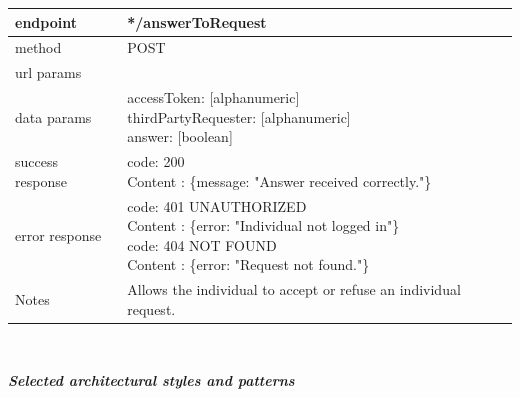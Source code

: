 \begin{legal}
\begin{itemize}
						\begin{tabularx}{\linewidth}{| l | l |}
							\hline
							endpoint & */answerToRequest \\
							\hline
							method & POST \\
							\hline
							url params & \\
							\hline
							data params &
							\parbox{0.7\textwidth}{
								\bigskip
								accessToken: [alphanumeric]\\
								thirdPartyRequester: [alphanumeric]\\
								answer: [boolean]
								\bigskip
							} \\
							\hline
							success response &
							\parbox{0.7\textwidth}{
								\bigskip
								code: 200\\
								Content : \{message: "Answer received correctly."\}
								\bigskip
							} \\
							\hline
							error response &
							\parbox{0.7\textwidth}{
								\bigskip
								code: 401 UNAUTHORIZED \\
								Content : \{error: "Individual not logged in"\}\\
								code: 404 NOT FOUND \\
								Content : \{error: "Request not found."\}
								\bigskip
							} \\
							\hline
							Notes & 
							\parbox{0.7\textwidth}{
								\bigskip Allows the individual to accept or refuse an individual request.
							\bigskip}  \\
							\hline
						\end{tabularx}\\
				\end{itemize}
		\item \textit{\textbf{Selected architectural styles and patterns}}\\\\
			
  	\end{legal}
